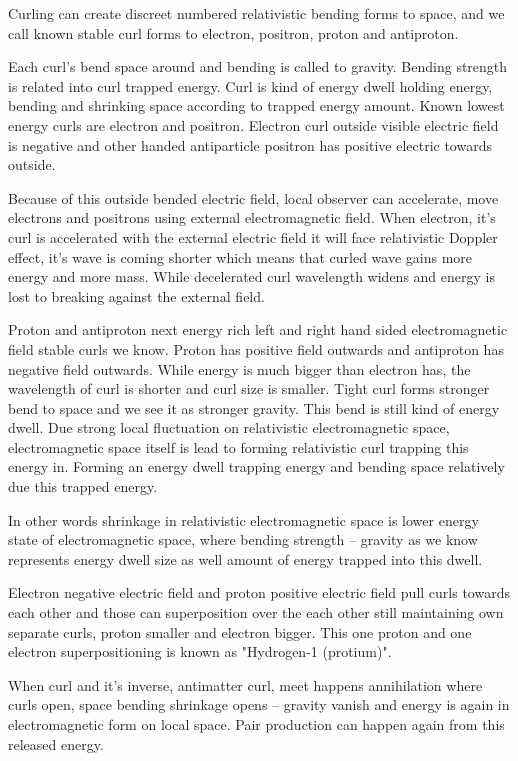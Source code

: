 Curling can create discreet numbered relativistic bending forms to space, and
we call known stable curl forms to electron, positron, proton and antiproton.

Each curl's bend space around and bending is called to gravity. Bending
strength is related into curl trapped energy. Curl is kind of energy dwell
holding energy, bending and shrinking space according to trapped energy
amount. Known lowest energy curls are electron and positron. Electron curl
outside visible electric field is negative and other handed antiparticle
positron has positive electric towards outside.

Because of this outside bended electric field, local observer can accelerate,
move electrons and positrons using external electromagnetic field. When
electron, it's curl is accelerated with the external electric field it will
face relativistic Doppler effect, it's wave is coming shorter which means that
curled wave gains more energy and more mass. While decelerated curl wavelength
widens and energy is lost to breaking against the external field.

Proton and antiproton next energy rich left and right hand sided
electromagnetic field stable curls we know. Proton has positive field outwards
and antiproton has negative field outwards. While energy is much bigger than
electron has, the wavelength of curl is shorter and curl size is smaller.
Tight curl forms stronger bend to space and we see it as stronger gravity.
This bend is still kind of energy dwell. Due strong local fluctuation on
relativistic electromagnetic space, electromagnetic space itself is lead to
forming relativistic curl trapping this energy in. Forming an energy dwell
trapping energy and bending space relatively due this trapped energy.

In other words shrinkage in relativistic electromagnetic space is lower energy
state of electromagnetic space, where bending strength -- gravity as we know
represents energy dwell size as well amount of energy trapped into this dwell.

Electron negative electric field and proton positive electric field pull curls
towards each other and those can superposition over the each other still
maintaining own separate curls, proton smaller and electron bigger. This one
proton and one electron superpositioning is known as "Hydrogen-1 (protium)".

When curl and it's inverse, antimatter curl, meet happens
annihilation\allowbreak\cite{ Annihilation} where curls open, space bending
shrinkage opens -- gravity vanish and energy is again in electromagnetic form
on local space. Pair production\allowbreak\cite{PairProduction} can happen
again from this released energy.

